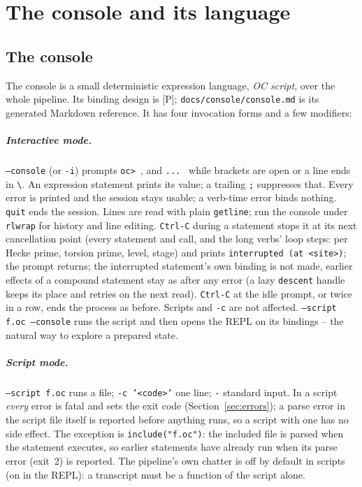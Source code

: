 \documentclass[11pt,openany]{report}
\newcommand{\cli}[1]{\texttt{#1}}
\newcommand{\file}[1]{\nolinkurl{#1}}
\newcommand{\vb}[1]{\texttt{#1}}
\begin{document}
\chapter{The console and its language}\label{ch:console}

\section{The console}\label{sec:console}

The console is a small deterministic expression language, \emph{OC script}, over the whole pipeline.
Its binding design is [P]; \file{docs/console/console.md} is its generated Markdown reference. It has
four invocation forms and a few modifiers:




\paragraph{Interactive mode.} \cli{--console} (or \cli{-i}) prompts \texttt{oc> }, and \texttt{... }
while brackets are open or a line ends in \verb|\|. An expression statement prints its value; a trailing
\texttt{;} suppresses that. Every error is printed and the session stays usable; a verb-time error binds
nothing. \texttt{quit} ends the session. Lines are read with plain \texttt{getline}; run the console under
\texttt{rlwrap} for history and line editing. \texttt{Ctrl-C} during a statement stops it at its next
cancellation point (every statement and call, and the long verbs' loop steps: per Hecke prime, torsion prime,
level, stage) and prints \texttt{interrupted (at <site>)}; the prompt returns; the interrupted statement's own binding is not made, earlier effects of a compound statement stay as after any error (a lazy \texttt{descent} handle keeps its place and retries on the next read).
\texttt{Ctrl-C} at the idle prompt, or twice in a row, ends the process as before. Scripts and \cli{-c} are
not affected. \cli{--script f.oc --console} runs the script and then opens the REPL on its
bindings -- the natural way to explore a prepared state.

\paragraph{Script mode.} \cli{--script f.oc} runs a file; \cli{-c '<code>'} one line; \cli{-} standard
input. In a script \emph{every} error is fatal and sets the exit code (Section~\ref{sec:errors}); a parse
error in the script file itself is reported before anything runs, so a script with one has no side effect.
The exception is \vb{include("f.oc")}: the included file is parsed when the statement executes, so earlier
statements have already run when its parse error (exit~2) is reported. The pipeline's own
chatter is off by default in scripts (on in the REPL): a transcript must be a function of the script
alone.
\end{document}

